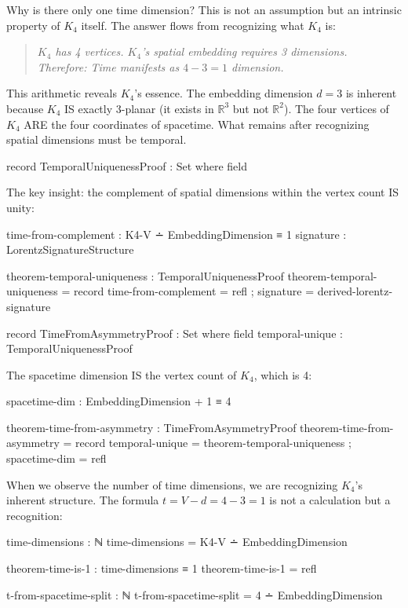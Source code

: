 \documentclass[11pt,a4paper]{book}
\begin{document}
Why is there only one time dimension? This is not an assumption but an intrinsic property of $K_4$ itself. The answer flows from recognizing what $K_4$ is:

\begin{quote}
\emph{$K_4$ has 4 vertices. $K_4$'s spatial embedding requires 3 dimensions.\\
Therefore: Time manifests as $4 - 3 = 1$ dimension.}
\end{quote}

This arithmetic reveals $K_4$'s essence. The embedding dimension $d = 3$ is inherent because $K_4$ IS exactly 3-planar (it exists in $\mathbb{R}^3$ but not $\mathbb{R}^2$). The four vertices of $K_4$ ARE the four coordinates of spacetime. What remains after recognizing spatial dimensions must be temporal.

\begin{code}
record TemporalUniquenessProof : Set where
  field
\end{code}

The key insight: the complement of spatial dimensions within the vertex count IS unity:

\begin{code}
    time-from-complement : K4-V ∸ EmbeddingDimension ≡ 1
    signature : LorentzSignatureStructure
    
theorem-temporal-uniqueness : TemporalUniquenessProof
theorem-temporal-uniqueness = record 
  { time-from-complement = refl
  ; signature = derived-lorentz-signature
  }

record TimeFromAsymmetryProof : Set where
  field
    temporal-unique : TemporalUniquenessProof
\end{code}

The spacetime dimension IS the vertex count of $K_4$, which is 4:

\begin{code}
    spacetime-dim : EmbeddingDimension + 1 ≡ 4

theorem-time-from-asymmetry : TimeFromAsymmetryProof
theorem-time-from-asymmetry = record
  { temporal-unique = theorem-temporal-uniqueness
  ; spacetime-dim = refl
  }
\end{code}

When we observe the number of time dimensions, we are recognizing $K_4$'s inherent structure. The formula $t = V - d = 4 - 3 = 1$ is not a calculation but a recognition:

\begin{code}
time-dimensions : ℕ
time-dimensions = K4-V ∸ EmbeddingDimension

theorem-time-is-1 : time-dimensions ≡ 1
theorem-time-is-1 = refl

t-from-spacetime-split : ℕ
t-from-spacetime-split = 4 ∸ EmbeddingDimension
\end{code}
\end{document}
